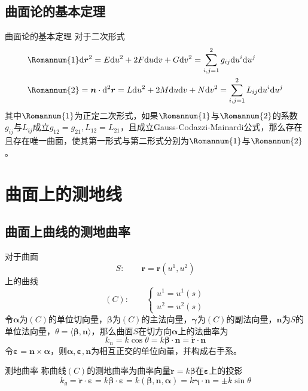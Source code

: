 \documentclass[lang = cn, scheme = chinese, thmcnt = section]{elegantbook}
\newcommand{\bs}{\boldsymbol}          %
\newcommand{\dd}{\mathrm{d}}           %
\begin{document}
\subsection{曲面论的基本定理}

\begin{theorem}{曲面论的基本定理}
	对于二次形式
	\begin{align*}
		& {\rm\Romannum{1}}
		\dd \bs{r}^2
		=E\dd u^2+2F\dd u\dd v+G\dd v^2
		=\sum_{i,j=1}^{2}g_{ij}\dd u^i\dd u^j\\
		& {\rm\Romannum{2}}
		=\bs{n}\cdot\dd^2\bs{r}
		=L\dd u^2+2M\dd u\dd v+N\dd v^2
		=\sum_{i,j=1}^{2}L_{ij}\dd u^i\dd u^j
	\end{align*}
	其中$\rm\Romannum{1}$为正定二次形式，如果$\rm\Romannum{1}$与$\rm\Romannum{2}$的系数$g_{ij}$与$L_{ij}$成立$g_{12}=g_{21},L_{12}=L_{21}$，且成立Gauss-Codazzi-Mainardi公式，那么存在且存在唯一曲面，使其第一形式与第二形式分别为$\rm\Romannum{1}$与$\rm\Romannum{2}$。
\end{theorem}

\section{曲面上的测地线}

\subsection{曲面上曲线的测地曲率}

对于曲面%
$$
S:\qquad \bs{r}=\bs{r}(u^1,u^2)
$$
上的曲线%
$$
(C):\qquad \begin{cases}
	u^1=u^1(s)\\
	u^2=u^2(s)
\end{cases}
$$
令$\bs{\alpha}$为$(C)$的单位切向量，$\bs{\beta}$为$(C)$的主法向量，$\bs{\gamma}$为$(C)$的副法向量，$\bs{n}$为$S$的单位法向量，$\theta=\langle \bs{\beta},\bs{n}\rangle$，那么曲面$S$在切方向$\bs{\alpha}$上的法曲率为%
$$
k_n=k\cos\theta=k\bs{\beta}\cdot\bs{n}=\ddot{\bs{r}}\cdot\bs{n}
$$
令$\bs{\varepsilon}=\bs{n}\times\bs{\alpha}$，则$\bs{\alpha},\bs{\varepsilon},\bs{n}$为相互正交的单位向量，并构成右手系。

\begin{definition}{测地曲率}
	称曲线$(C)$的测地曲率为曲率向量$\ddot{\bs{r}}=k\bs{\beta}$在$\bs{\varepsilon}$上的投影%
	$$
	k_g
	=\ddot{\bs{r}}\cdot\bs{\varepsilon}
	=k\bs{\beta}\cdot\bs{\varepsilon}
	=k(\bs{\beta},\bs{n},\bs{\alpha})
	=k\bs{\gamma}\cdot\bs{n}
	=\pm k\sin\theta
	$$
\end{definition}
\end{document}

